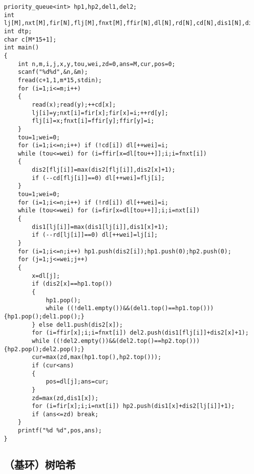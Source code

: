 \documentclass{ctexart}
\begin{document}
\begin{lstlisting}
priority_queue<int> hp1,hp2,del1,del2;
int lj[M],nxt[M],fir[N],flj[M],fnxt[M],ffir[N],dl[N],rd[N],cd[N],dis1[N],dis2[N];
int dtp;
char c[M*15+1];
int main()
{
	int n,m,i,j,x,y,tou,wei,zd=0,ans=M,cur,pos=0;
	scanf("%d%d",&n,&m);
	fread(c+1,1,m*15,stdin);
	for (i=1;i<=m;i++)
	{
		read(x);read(y);++cd[x];
		lj[i]=y;nxt[i]=fir[x];fir[x]=i;++rd[y];
		flj[i]=x;fnxt[i]=ffir[y];ffir[y]=i;
	}
	tou=1;wei=0;
	for (i=1;i<=n;i++) if (!cd[i]) dl[++wei]=i;
	while (tou<=wei) for (i=ffir[x=dl[tou++]];i;i=fnxt[i]) 
	{
		dis2[flj[i]]=max(dis2[flj[i]],dis2[x]+1);
		if (--cd[flj[i]]==0) dl[++wei]=flj[i];
	}
	tou=1;wei=0;
	for (i=1;i<=n;i++) if (!rd[i]) dl[++wei]=i;
	while (tou<=wei) for (i=fir[x=dl[tou++]];i;i=nxt[i]) 
	{
		dis1[lj[i]]=max(dis1[lj[i]],dis1[x]+1);
		if (--rd[lj[i]]==0) dl[++wei]=lj[i];
	}
	for (i=1;i<=n;i++) hp1.push(dis2[i]);hp1.push(0);hp2.push(0);
	for (j=1;j<=wei;j++)
	{
		x=dl[j];
		if (dis2[x]==hp1.top())
		{
			hp1.pop();
			while ((!del1.empty())&&(del1.top()==hp1.top())) {hp1.pop();del1.pop();}
		} else del1.push(dis2[x]);
		for (i=ffir[x];i;i=fnxt[i]) del2.push(dis1[flj[i]]+dis2[x]+1);
		while ((!del2.empty())&&(del2.top()==hp2.top())) {hp2.pop();del2.pop();}
		cur=max(zd,max(hp1.top(),hp2.top()));
		if (cur<ans)
		{
			pos=dl[j];ans=cur;
		}
		zd=max(zd,dis1[x]);
		for (i=fir[x];i;i=nxt[i]) hp2.push(dis1[x]+dis2[lj[i]]+1);
		if (ans<=zd) break;
	}
	printf("%d %d",pos,ans);
}
\end{lstlisting}

\subsection{（基环）树哈希}
\end{document}
